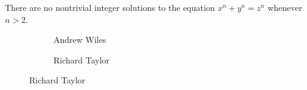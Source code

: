 \begin{frame}
\begin{thm}
There are no nontrivial integer solutions to the equation $x^n + y^n= z^n$ whenever $n > 2$.
\end{thm}

	\begin{figure}[h]
	\centering
	\begin{subfigure}{0.3\textwidth}
	\captionsetup{labelformat=empty}
	\centering
	\caption{\scriptsize Andrew Wiles}
	\end{subfigure}
	\begin{subfigure}{0.3\textwidth}
	\captionsetup{labelformat=empty}
	\centering
	\caption{\scriptsize Richard Taylor}
	\end{subfigure}
	\end{figure}

\end{frame}



